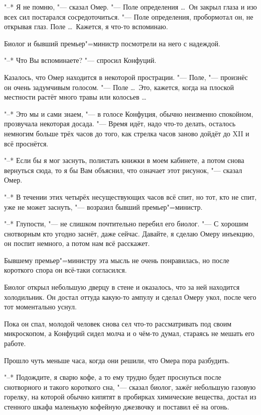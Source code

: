 "--* Я не помню, "--- сказал Омер.
"--- Поле определения \ldots\
Он закрыл глаза и изо всех сил постарался сосредоточиться.
"--- Поле определения, пробормотал он, не открывая глаз.
Поле \ldots\
Кажется, я что-то вспоминаю.

Биолог и бывший премьер"=министр посмотрели на него с надеждой.

"--* Что Вы вспоминаете? "--- спросил Конфуций.

Казалось, что Омер находится в некоторой прострации.
"--- Поле, "--- произнёс он очень задумчивым голосом.
"--- Поле \ldots\
Это, кажется, когда на плоской местности растёт много травы или колосьев \ldots

"--* Это мы и сами знаем, "--- в голосе Конфуция, обычно неизменно спокойном,
прозвучала некоторая досада.
"--- Время идёт, надо что-то делать, осталось немногим больше трёх часов до того,
как стрелка часов заново дойдёт до XII и всё проснётся.

"--* Если бы я мог заснуть, полистать книжки в моем кабинете, а потом снова
вернуться сюда, то я бы Вам объяснил, что означает этот рисунок, "--- сказал
Омер.

"--* В течении этих четырёх несуществующих часов всё спит, но тот, кто не спит,
уже не может заснуть, "--- возразил бывший премьер"=министр.

"--* Глупости, "--- не слишком почтительно перебил его биолог.
"--- С хорошим снотворным кто угодно заснёт, даже сейчас.
Давайте, я сделаю Омеру инъекцию, он поспит немного, а потом нам всё расскажет.

Бывшему премьер"=министру эта мысль не очень понравилась, но после короткого
спора он всё-таки согласился.

Биолог открыл небольшую дверцу в стене и оказалось, что за ней находится
холодильник.
Он достал оттуда какую-то ампулу и сделал Омеру укол, после чего тот моментально
уснул.

Пока он спал, молодой человек снова сел что-то рассматривать под своим
микроскопом, а Конфуций сидел молча и о чём-то думал, стараясь не мешать его
работе.

Прошло чуть меньше часа, когда они решили, что Омера пора разбудить.

"--* Подождите, я сварю кофе, а то ему трудно будет проснуться после
снотворного и такого короткого сна, "--- сказал биолог, зажёг небольшую
газовую горелку, на которой обычно кипятят в пробирках химические вещества,
достал из стенного шкафа маленькую кофейную джезвочку и поставил её на огонь.

